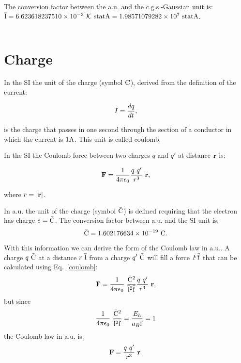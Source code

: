 \documentclass[12pt,a4paper,twoside]{report}
\def\bari{6.623618237510\times 10^{-3}}
\def\barc{1.602176634\times 10^{-19}}
\def\baricgs{1.98571079282\times 10^{7}}
\begin{document}
{{\color{green} The conversion factor between the a.u. and the c.g.s.-Gaussian 
unit is: ${\rm \bar I}=\bari\ \mathcal{K}\ {\rm statA}=\baricgs\ {\rm statA}$. \\
}
\\

\newpage
{\color{coral}\section{Charge}}
\color{black}
In the SI the unit of the charge (symbol ${\rm C}$), derived from the 
definition of the current:

\begin{tcolorbox}
\begin{equation}
I={dq \over dt},
\label{current}
\end{equation}
\end{tcolorbox}

is the charge that passes in one second through the section of a conductor
in which the current is $1 {\rm A}$. This unit is called coulomb.

In the SI the Coulomb force between two charges $q$ and $q'$ at
distance ${\bf r}$ is:

\begin{tcolorbox}
\begin{equation}
{\bf F} = {1\over 4 \pi \epsilon_0} {q\ q' \over r^3}\ {\bf r},
\label{coulomb}
\end{equation}
\end{tcolorbox}

where $r=|{\bf r}|$.
\\

{\color{web-blue} In a.u. the unit of the charge (symbol ${\rm \bar C}$) is
defined requiring that the electron has charge $e={\rm \bar C}$. The 
conversion 
factor between a.u. and the SI unit is: 
\begin{equation}
{\rm \bar C}=\barc\ {\rm C}.
\end{equation}

With this information we can derive the form of the Coulomb law in a.u..
A charge $q\ {\rm \bar C}$ at a distance $r\ {\rm \bar l}$ from a
charge $q'\ {\rm \bar C}$ will fill a force $F {\rm \bar f}$ that can be 
calculated using Eq.~\ref{coulomb}:
\begin{equation}
{\bf F} = {1\over 4 \pi \epsilon_0}\ {{\rm \bar C}^2 \over {\rm \bar l}^2 {\rm \bar f}} 
{q\ q' \over r^3}\ {\bf r},
\end{equation}
but since
\begin{equation}
{1\over 4 \pi \epsilon_0}\ {{\rm \bar C}^2 \over {\rm \bar l}^2{\rm \bar f}} = 
{E_h \over a_B {\rm \bar f}}=1
\end{equation}
the Coulomb law in a.u. is:
\begin{equation}
{\bf F} = {q\ q' \over r^3}\ {\bf r}. 
\end{equation}
}
\\

}
\end{document}
